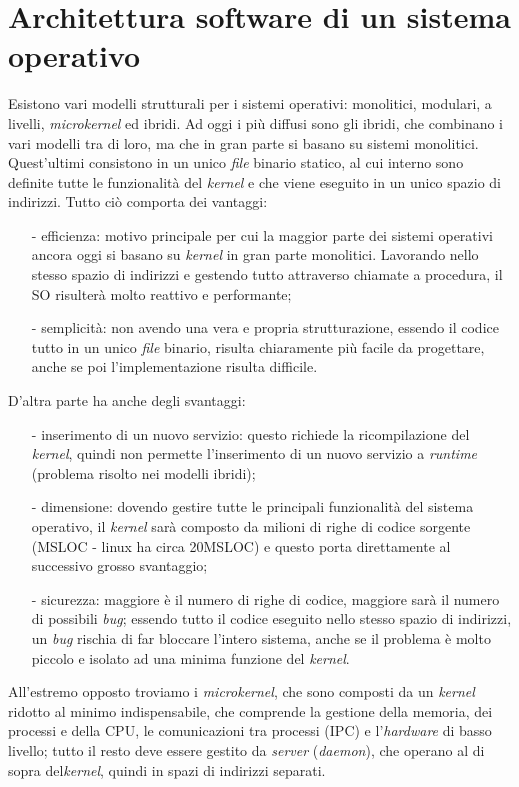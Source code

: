 \section{Architettura software di un sistema operativo}
Esistono vari modelli strutturali per i sistemi operativi: monolitici, modulari, a livelli, \textit{microkernel} ed ibridi. Ad oggi i più diffusi sono gli ibridi, che combinano i vari modelli tra di loro, ma che in gran parte si basano su sistemi monolitici. Quest'ultimi consistono in un unico \textit{file} binario statico, al cui interno sono definite tutte le funzionalità del \textit{kernel} e che viene eseguito in un unico spazio di indirizzi. Tutto ciò comporta dei vantaggi: 
\begin{itemize}
	\item[-] efficienza: motivo principale per cui la maggior parte dei sistemi operativi ancora oggi si basano su \textit{kernel} in gran parte monolitici. Lavorando nello stesso spazio di indirizzi e gestendo tutto attraverso chiamate a procedura, il SO risulterà molto reattivo e performante;
	\item[-] semplicità: non avendo una vera e  propria strutturazione, essendo il codice tutto in un unico \textit{file} binario, risulta chiaramente più facile da progettare, anche se poi l'implementazione risulta difficile.
\end{itemize} 
D'altra parte ha anche degli svantaggi: 
\begin{itemize}
	\item[-] inserimento di un nuovo servizio: questo richiede la ricompilazione del \textit{kernel}, quindi non permette l'inserimento di un nuovo servizio a \textit{runtime} (problema risolto nei modelli ibridi);
	\item[-] dimensione: dovendo gestire tutte le principali funzionalità del sistema operativo, il \textit{kernel} sarà composto da milioni di righe di codice sorgente (MSLOC - linux ha circa 20MSLOC) e questo porta direttamente al successivo grosso svantaggio;
	\item[-] sicurezza: maggiore è il numero di righe di codice, maggiore sarà il numero di possibili \textit{bug}; essendo tutto il codice eseguito nello stesso spazio di indirizzi, un \textit{bug} rischia di far bloccare l'intero sistema, anche se il problema è molto piccolo e isolato ad una minima funzione del \textit{kernel}.
\end{itemize}

All'estremo opposto troviamo i \textit{microkernel}, che sono composti da un \textit{kernel} ridotto al minimo indispensabile, che comprende la gestione della memoria, dei processi e della CPU, le comunicazioni tra processi (IPC) e l'\textit{hardware} di basso livello; tutto il resto deve essere gestito da \textit{server} (\textit{daemon}), che operano al di sopra del\textit{kernel}, quindi in spazi di indirizzi separati.

